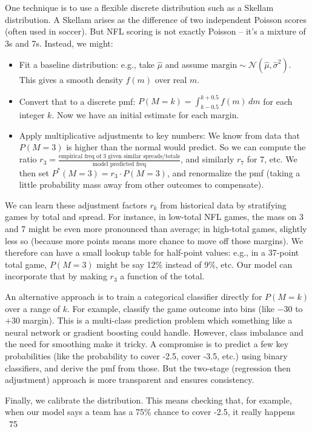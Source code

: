 \documentclass[11pt]{amsart}
\begin{document}
One technique is to use a flexible discrete distribution such as a Skellam distribution. A Skellam arises as the difference of two independent Poisson scores (often used in soccer). But NFL scoring is not exactly Poisson – it’s a mixture of 3s and 7s. Instead, we might:
\begin{itemize}
    \item Fit a baseline distribution: e.g., take $\hat{\mu}$ and assume $\text{margin} \sim \mathcal{N}(\hat{\mu}, \hat{\sigma}^2)$. This gives a smooth density $f(m)$ over real $m$.
    \item Convert that to a discrete pmf: $P(M = k) = \int_{k-0.5}^{k+0.5} f(m)\,dm$ for each integer $k$. Now we have an initial estimate for each margin.
    \item Apply multiplicative adjustments to key numbers: We know from data that $P(M=3)$ is higher than the normal would predict. So we can compute the ratio $r_3 = \frac{\text{empirical freq of 3 given similar spreads/totals}}{\text{model predicted freq}}$, and similarly $r_7$ for 7, etc. We then set $P^*(M=3) = r_3 \cdot P(M=3)$, and renormalize the pmf (taking a little probability mass away from other outcomes to compensate).
\end{itemize}
We can learn these adjustment factors $r_k$ from historical data by stratifying games by total and spread. For instance, in low-total NFL games, the mass on 3 and 7 might be even more pronounced than average; in high-total games, slightly less so (because more points means more chance to move off those margins). We therefore can have a small lookup table for half-point values: e.g., in a 37-point total game, $P(M=3)$ might be say 12\% instead of 9\%, etc. Our model can incorporate that by making $r_3$ a function of the total.

An alternative approach is to train a categorical classifier directly for $P(M = k)$ over a range of $k$. For example, classify the game outcome into bins (like $-30$ to $+30$ margin). This is a multi-class prediction problem which something like a neural network or gradient boosting could handle. However, class imbalance and the need for smoothing make it tricky. A compromise is to predict a few key probabilities (like the probability to cover -2.5, cover -3.5, etc.) using binary classifiers, and derive the pmf from those. But the two-stage (regression then adjustment) approach is more transparent and ensures consistency.

Finally, we calibrate the distribution. This means checking that, for example, when our model says a team has a 75\% chance to cover -2.5, it really happens ~75%
\end{document}
